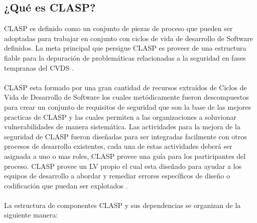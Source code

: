 \documentclass[runningheads,a4paper]{llncs}
\begin{document}
\subsection{¿Qué es \gls{CLASP}?}
\gls{CLASP} es definido como un conjunto de piezas de proceso que pueden ser adoptadas para trabajar en conjunto con ciclos de vida de desarrollo de \gls{Software} definidos. La meta principal que persigue \gls{CLASP} es proveer de una estructura fiable para la depuración de problemáticas relacionadas a la seguridad en fases tempranas del \gls{CVDS} \cite{CLASPIntroduction}. 
\\\\
\gls{CLASP} esta formado por una gran cantidad de recursos extraídos de Ciclos de Vida de Desarrollo de \gls{Software} los cuales metódicamente fueron descompuestos para crear un conjunto de requisitos de seguridad que son la base de las mejores practicas de \gls{CLASP} y las cuales permiten a las organizaciones a soluvionar vulnerabilidades de manera sistemática. Las actividades para la mejora de la seguridad de \gls{CLASP} fueron diseñadas para ser integradas facilmente con otros procesos de desarrollo existentes, cada una de estas actividades deberá ser asignada a uno o mas roles, \gls{CLASP} provee una guía para los participantes del proceso. \gls{CLASP} provee un \gls{LV} propio el cual esta diseñado para ayudar a los equipos de desarrollo a abordar y remediar errores específicos de diseño o codificación que puedan ser explotados \cite{CLASPConcepts}.  
\\\\
La estructura de componentes \gls{CLASP} y sus dependencias se organizan de la siguiente manera:
\end{document}
